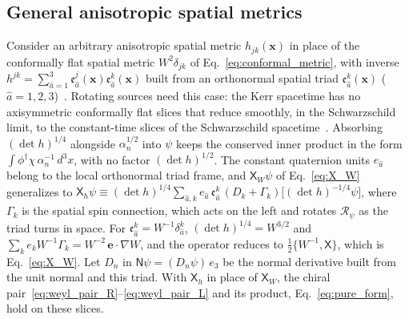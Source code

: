 \documentclass[aps,prd,onecolumn,tightenlines,nofootinbib,notitlepage,11pt,floatfix]{revtex4-2}
\theoremstyle{indentedtheorem}
\begin{document}
\subsection{General anisotropic spatial metrics}
\label{sec:general_metric}

Consider an arbitrary anisotropic spatial metric $h_{jk}(\mathbf{x})$ in place of the conformally flat spatial metric $W^2\delta_{jk}$ of Eq.~\eqref{eq:conformal_metric}, with inverse $h^{jk} = \sum_{\hat{a}=1}^3 \mathfrak{e}_{\hat{a}}^j(\mathbf{x})\mathfrak{e}_{\hat{a}}^k(\mathbf{x})$ built from an orthonormal spatial triad $\mathfrak{e}_{\hat{a}}^k(\mathbf{x})$ ($\hat{a}=1,2,3$)~\citep{ObukhovSilenkoTeryaev2013Spin}. Rotating sources need this case: the Kerr spacetime has no axisymmetric conformally flat slices that reduce smoothly, in the Schwarzschild limit, to the constant-time slices of the Schwarzschild spacetime~\citep{GaratPrice2000Nonexistence}. Absorbing $(\det h)^{1/4}$ alongside $\alpha_n^{1/2}$ into $\psi$ keeps the conserved inner product in the form $\int\phi^\dagger\chi\,\alpha_n^{-1}\,d^3x$, with no factor $(\det h)^{1/2}$. The constant quaternion units $e_{\hat{a}}$ belong to the local orthonormal triad frame, and $\mathsf{X}_W\psi$ of Eq.~\eqref{eq:X_W} generalizes to $\mathsf{X}_h\psi \equiv (\det h)^{1/4}\sum_{\hat{a},k} e_{\hat{a}}\,\mathfrak{e}_{\hat{a}}^k\,(D_k+\Gamma_k)\big[(\det h)^{-1/4}\psi\big]$, where $\Gamma_k$ is the spatial spin connection, which acts on the left and rotates $\mathcal{R}_\psi$ as the triad turns in space. For $\mathfrak{e}_{\hat{a}}^k = W^{-1}\delta_{\hat{a}}^k$, $(\det h)^{1/4} = W^{3/2}$ and $\sum_k e_k W^{-1}\Gamma_k = W^{-2}\,\mathbf{e}\cdot\nabla W$, and the operator reduces to $\tfrac{1}{2}\{W^{-1},\mathsf{X}\}$, which is Eq.~\eqref{eq:X_W}. Let $D_n$ in $\mathsf{N}\psi=(D_n\psi)\,e_3$ be the normal derivative built from the unit normal and this triad. With $\mathsf{X}_h$ in place of $\mathsf{X}_W$, the chiral pair~\eqref{eq:weyl_pair_R}--\eqref{eq:weyl_pair_L} and its product, Eq.~\eqref{eq:pure_form}, hold on these slices.
\end{document}
